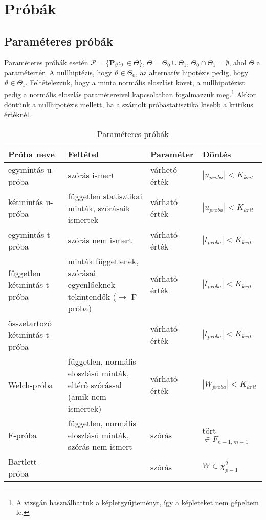 \chapter{Próbák}

\section{Paraméteres próbák}

Paraméteres próbák esetén $\mathcal{P} = \{ \mathbf{P}_\vartheta : _\vartheta \in \Theta\}$, $\Theta = \Theta_0 \cup \Theta_1$, $\Theta_0 \cap \Theta_1 = \emptyset$, ahol $\Theta$ a paramétertér. A nullhiptézis, hogy $\vartheta \in \Theta_0$, az alternatív hipotézis pedig, hogy $\vartheta \in \Theta_1$. Feltételezzük, hogy a minta normális eloszlást követ, a nullhipotézist pedig a normális eloszlás paramétereivel kapcsolatban fogalmazzuk meg.\footnote{A vizsgán használhattuk a képletgyűjteményt, így a képleteket nem gépeltem le.} Akkor döntünk a nullhipotézis mellett, ha a számolt próbastatisztika kisebb a kritikus értéknél.

\begin{table}[h]
\centering
\caption{Paraméteres próbák}
\label{tab:param}
\begin{tabular}{|p{}|p{5cm}|p{3cm}|p{3cm}|}
\hline
\textbf{Próba neve}            & \textbf{Feltétel}                                                             & Paraméter & Döntés                   \\ \hline
egymintás u-próba              & szórás ismert & várhetó érték & $|u_{proba}| < K_{krit}$ \\ \hline
kétmintás u-próba              & független statisztikai minták, szórásaik ismertek & várható érték & $|u_{proba}| < K_{krit}$ \\ \hline
egymintás t-próba              & szórás nem ismert & várható érték &  $|t_{proba}| < K_{krit}$ \\ \hline
független kétmintás t-próba    & minták függetlenek, szórásai egyenlőeknek tekintendők ($\rightarrow$ F-próba) & várható érték &  $|t_{proba}| < K_{krit}$ \\ \hline
összetartozó kétmintás t-próba & & várható érték &  $|t_{proba}| < K_{krit}$ \\ \hline
Welch-próba                    & független, normális eloszlású minták, eltérő szórással (amik nem ismertek) & várható érték &  $|W_{proba}| < K_{krit}$ \\ \hline
F-próba                        & független, normális eloszlású minták, szórás nem ismert & szórás &  tört $\in F_{n-1,m-1}$   \\ \hline
Bartlett-próba                        &  & szórás & $W \in \chi^2_{p-1}$   \\ \hline
\end{tabular}
\end{table}

